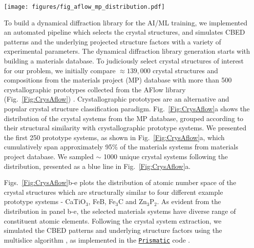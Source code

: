 \documentclass[%
 reprint,
superscriptaddress,
 amsmath,
 amssymb,
 prl,
]{revtex4-2}
\newcommand{\prismatic}{\href{https://prism-em.com/}{\texttt{Prismatic}}}
\begin{document}
\begin{figure*}[htbp]
    \centering
    \texttt{[image: figures/fig\_aflow\_mp\_distribution.pdf]}
    \caption{{\bf Crystal system extraction from the materials project database.} (a) Number of crystal systems chosen from each prototype systems for the training dataset. (b)-(e) Atomic number distribution of crystal systems belonging to the same prototype system as (b) CaTiO$_3$, (c) FeB, (d) Fe$_3$C, (e) Zn$_3$P$_2$.}
    \label{Fig:CrysAflow}
\end{figure*}

To build a dynamical diffraction library for the AI/ML training, we implemented an automated pipeline which selects the crystal structures, and simulates CBED patterns and the underlying projected structure factors with a variety of experimental parameters. The dynamical diffraction library generation starts with building a materials database. To judiciously select crystal structures of interest for our problem, we initially compare $\approx 139,000$ crystal structures and compositions from the materials project (MP) database \cite{Jain2013} with more than 500 crystallographic prototypes collected from the AFlow library (Fig.~\ref{Fig:CrysAflow}) \cite{mehl2017aflow,hicks2019aflow}. Crystallographic prototypes are an alternative and popular crystal structure classification paradigm.
Fig.~\ref{Fig:CrysAflow}a shows the distribution of the crystal systems from the MP database, grouped according to their structural similarity with crystallographic prototype systems. We presented the first 250 prototype systems, as shown in Fig.~\ref{Fig:CrysAflow}a, which cumulatively span approximately 95\% of the materials systems from materials project database. We sampled $\sim$ 1000 unique crystal systems following the distribution, presented as a blue line in Fig.~\ref{Fig:CrysAflow}a. 

Figs.~\ref{Fig:CrysAflow}b-e plots the distribution of atomic number space of the crystal structures which are structurally similar to four different example prototype systems - CaTiO$_3$, FeB, Fe$_3$C and Zn$_3$P$_2$. As evident from the distribution in panel b-e, the selected materials systems have diverse range of constituent atomic elements. Following the crystal system extraction, we simulated the CBED patterns and underlying structure factors using the multislice algorithm \cite{cowley1957scattering, kirkland2020advanced}, as implemented in the \prismatic{}  code \cite{ophus2017fast, dacosta2021prismatic}.
\end{document}
